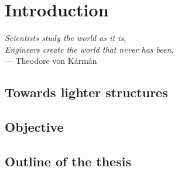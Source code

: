 \chapter*{Introduction}

\textit{Scientists study the world as it is,}\\
\textit{Engineers create the world that never has been.} \vspace{5pt} \\
--- Theodore von K\'arm\'an \\

\section*{Towards lighter structures}

\section*{Objective}

\section*{Outline of the thesis}